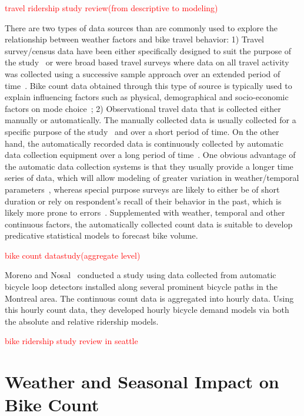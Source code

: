 \documentclass [11pt, proquest] {uwthesis}[2015/03/03]
\begin{document}
\textcolor{red}{travel ridership study review(from descriptive to modeling)}

There are two types of data sources than are commonly used to explore the relationship between weather factors and bike travel behavior: 1) Travel survey/census data have been either specifically designed to suit the purpose of the study~\cite{Palma97}  or were broad based travel surveys where data on all travel activity was collected using a successive sample approach over an extended period of time~\cite{Richardson:2000aa}. Bike count data obtained through this type of source is typically used to explain influencing factors such as physical, demographical and socio-economic factors on mode choice~\cite{Parkin:2008aa,Helbich:2014aa}; 2) Observational travel data that is collected either manually or automatically. The manually collected data is usually collected for a specific purpose of the study~\cite{Nankervis99} and over a short period of time. On the other hand, the automatically recorded data is continuously collected by automatic data collection equipment over a long period of time~\cite{Griswold:2011aa, Nosal:2014aa, Miranda-Moreno:2011aa, Thomas:2009aa}. One obvious advantage of the automatic data collection systems is that they usually provide a longer time series of data, which will allow modeling of greater variation in weather/temporal parameters~\cite{Ahmed12}, whereas special purpose surveys are likely to either be of short duration or rely on respondent's recall of their behavior in the past, which is likely more prone to errors~\cite{Palma97}. Supplemented with weather, temporal and other continuous factors, the automatically collected count data is suitable to develop predicative statistical models to forecast bike volume.  

\textcolor{red}{bike count datastudy(aggregate level)}

Moreno and Nosal~\cite{Miranda-Moreno:2011aa} conducted a study using data collected from automatic bicycle loop detectors installed along several prominent bicycle paths in the Montreal area. The continuous count data is aggregated into hourly data. Using this hourly count data, they developed hourly bicycle demand models via both the absolute and relative ridership models. 

\textcolor{red}{bike ridership study review in seattle}

\section{Weather and Seasonal Impact on Bike Count}
\end{document}

